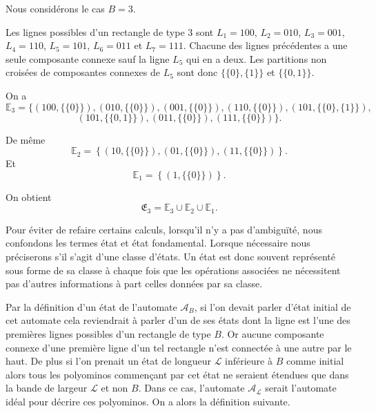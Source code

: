 \begin{Ex}\label{ex4}
Nous considérons le cas $B=3$.

Les lignes possibles d'un rectangle de type $3$ sont $L_{1}=100$, $L_{2}=010$, $L_{3}=001$, $L_{4}=110$, $L_{5}=101$, $L_{6}=011$ et $L_{7}=111$. Chacune des lignes précédentes a une seule composante connexe sauf la ligne $L_{5}$ qui en a deux. Les partitions non croisées de composantes connexes  de $L_{5}$ sont donc $\{\{0\},\{1\}\}$  et $\{\{0,1\}\}$.

On a 
$$\mathbb{E}_{3}=\{ (100,\lbrace\lbrace 0\rbrace\rbrace),(010,\lbrace\lbrace 0\rbrace\rbrace),(001,\lbrace\lbrace 0\rbrace\rbrace), (110,\lbrace\lbrace 0\rbrace\rbrace),(101,\lbrace\lbrace 0\rbrace,\lbrace 1\rbrace\rbrace),$$
$$(101,\lbrace\lbrace 0,1\rbrace\rbrace),(011,\lbrace\lbrace 0\rbrace\rbrace),(111,\lbrace\lbrace 0\rbrace\rbrace) \}.$$

De même 
$$\mathbb{E}_{2}=\left\lbrace (10,\lbrace \lbrace 0\rbrace\rbrace),(01,\lbrace\lbrace 0\rbrace\rbrace),(11,\lbrace\lbrace 0\rbrace\rbrace) \right\rbrace .$$ Et
$$\mathbb{E}_{1}= \left\lbrace  (1,\lbrace\lbrace 0\rbrace\rbrace)\right\rbrace .$$

On obtient 
$$\mathfrak{E}_{3}=\mathbb{E}_{3}\cup\mathbb{E}_{2}\cup\mathbb{E}_{1}. $$
\end{Ex}
\begin{Rem}\label{rem4}
 Pour éviter de refaire certains calculs, lorsqu'il n'y a pas d'ambiguïté, nous confondons les termes état et état fondamental. Lorsque  nécessaire nous préciserons s'il s'agit d'une classe d'états. Un état est donc souvent représenté sous forme de sa classe à chaque fois que les opérations  associées ne nécessitent pas d'autres informations à part celles données par sa classe.

\end{Rem}
Par la définition d'un état de l'automate  $\mathcal{A}_{B}$, si l'on devait parler d'état initial  de cet automate cela reviendrait à parler d'un de ses états dont la ligne est l'une des premières lignes possibles d'un rectangle de type $B$. Or aucune  composante connexe d'une première ligne d'un tel rectangle n'est connectée à une autre par le haut. De plus si l'on prenait  un état de longueur $\mathcal{L}$ inférieure à $B$ comme  initial alors tous les polyominos commençant par cet état ne seraient étendues que dans la bande de largeur  $\mathcal{L}$ et non $B$. Dans ce cas, l'automate $\mathcal{A}_{\mathcal{L}}$ serait  l’automate idéal pour décrire ces polyominos. On a alors la définition suivante.
